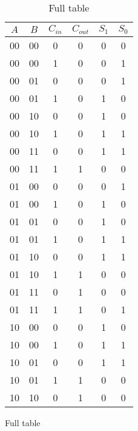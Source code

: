 \documentclass{article}
\begin{document}
\begin{table}[H]
    \centering
    \begin{subfigure}{0.4\linewidth}
        \caption{Full table}
        \label{tab:truth-table-mux}
        \begin{tabular}{c c c | c c c}
            \toprule
            $A$ & $B$ & $C_{in}$ & $C_{out}$ & $S_1$ & $S_0$ \\
            \midrule
            00  & 00  & 0        & 0         & 0     & 0     \\
            00  & 00  & 1        & 0         & 0     & 1     \\
            00  & 01  & 0        & 0         & 0     & 1     \\
            00  & 01  & 1        & 0         & 1     & 0     \\
            00  & 10  & 0        & 0         & 1     & 0     \\
            00  & 10  & 1        & 0         & 1     & 1     \\
            00  & 11  & 0        & 0         & 1     & 1     \\
            00  & 11  & 1        & 1         & 0     & 0     \\
            01  & 00  & 0        & 0         & 0     & 1     \\
            01  & 00  & 1        & 0         & 1     & 0     \\
            01  & 01  & 0        & 0         & 1     & 0     \\
            01  & 01  & 1        & 0         & 1     & 1     \\
            01  & 10  & 0        & 0         & 1     & 1     \\
            01  & 10  & 1        & 1         & 0     & 0     \\
            01  & 11  & 0        & 1         & 0     & 0     \\
            01  & 11  & 1        & 1         & 0     & 1     \\
            10  & 00  & 0        & 0         & 1     & 0     \\
            10  & 00  & 1        & 0         & 1     & 1     \\
            10  & 01  & 0        & 0         & 1     & 1     \\
            10  & 01  & 1        & 1         & 0     & 0     \\
            10  & 10  & 0        & 1         & 0     & 0     \\

\end{tabular}
\end{subfigure}
\end{table}
\end{document}
